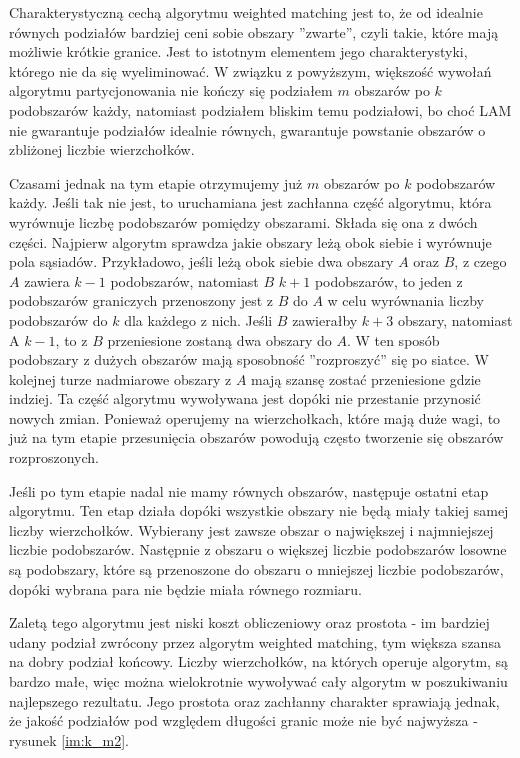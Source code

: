 Charakterystyczną cechą algorytmu weighted matching jest to, że od idealnie równych podziałów bardziej ceni sobie obszary
''zwarte'', czyli takie, które mają możliwie krótkie granice.
Jest to istotnym elementem jego charakterystyki, którego nie da się wyeliminować.
W związku z powyższym, większość wywołań algorytmu partycjonowania
nie kończy się podziałem $m$ obszarów po $k$ podobszarów każdy, natomiast podziałem bliskim temu podziałowi, bo choć LAM nie gwarantuje
podziałów idealnie równych, gwarantuje powstanie obszarów o zbliżonej liczbie wierzchołków.

Czasami jednak na tym etapie otrzymujemy już $m$ obszarów po $k$ podobszarów każdy.
Jeśli tak nie jest, to uruchamiana jest
zachłanna część algorytmu, która wyrównuje liczbę podobszarów pomiędzy obszarami.
Składa się ona z dwóch części.
Najpierw algorytm sprawdza jakie obszary leżą obok siebie i wyrównuje pola sąsiadów.
Przykładowo, jeśli leżą obok siebie dwa obszary $A$ oraz $B$, z czego $A$ zawiera $k-1$ podobszarów, natomiast $B$ $k+1$
podobszarów, to jeden z podobszarów graniczych przenoszony jest z $B$ do $A$ w celu wyrównania liczby
podobszarów do $k$ dla każdego z nich.
Jeśli $B$ zawierałby $k+3$ obszary, natomiast A $k-1$, to z $B$ przeniesione zostaną dwa obszary do $A$.
W ten sposób podobszary z dużych obszarów mają sposobność ''rozproszyć'' się po siatce.
W kolejnej turze nadmiarowe obszary z $A$ mają szansę zostać przeniesione gdzie indziej.
Ta część algorytmu wywoływana jest dopóki nie przestanie przynosić nowych zmian.
Ponieważ operujemy na wierzchołkach, które mają duże wagi, to już na tym etapie przesunięcia obszarów powodują często
tworzenie się obszarów rozproszonych.

Jeśli po tym etapie nadal nie mamy równych obszarów, następuje ostatni etap algorytmu.
Ten etap działa dopóki wszystkie obszary nie będą miały takiej samej liczby wierzchołków.
Wybierany jest zawsze obszar o największej i najmniejszej liczbie podobszarów.
Następnie z obszaru o większej liczbie podobszarów losowne są podobszary, które są przenoszone do
obszaru o mniejszej liczbie podobszarów, dopóki wybrana para nie będzie miała równego rozmiaru.

Zaletą tego algorytmu jest niski koszt obliczeniowy oraz prostota - im bardziej udany podział zwrócony przez algorytm
weighted matching, tym większa szansa na dobry podział końcowy.
Liczby wierzchołków, na których operuje algorytm, są bardzo małe, więc można wielokrotnie
wywoływać cały algorytm w poszukiwaniu najlepszego rezultatu.
Jego prostota oraz zachłanny charakter sprawiają jednak, że
jakość podziałów pod względem długości granic może nie być najwyższa - rysunek \ref{im:k_m2}.

